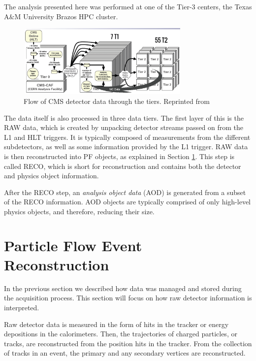 The analysis presented here was performed at one of the Tier-3 centers, the Texas A$\&$M University Brazos HPC cluster. 

 \begin{figure}[H]
 	\centering
 	\includegraphics[width=0.75\textwidth]{figures/dataflowtiers_MC.png}
 	\singlespace
 	\caption{Flow of CMS detector data through the tiers. Reprinted from \cite{CMSdatatier}}
 	\label{fig:datatier}
 \end{figure}

 The data itself is also processed in three data tiers. The first layer of this is the RAW data, which is created by unpacking detector streams passed on from the L1 and HLT triggers. It is typically composed of measurements from the different subdetectors, as well as some information provided by the L1 trigger. RAW data is then reconstructed into PF objects, as explained in Section \ref{sec:track}. This step is called RECO, which is short for reconstruction and contains both the detector and physics object information. 

 After the RECO step, an \textit{analysis object data} (AOD) is generated from a subset of the RECO information. AOD objects are typically comprised of only high-level physics objects, and therefore, reducing their size. 

\section{Particle Flow Event Reconstruction}
\label{sec:track}

 In the previous section we described how data was managed and stored during the acquisition process. This section will focus on how raw detector information is interpreted.  

Raw detector data is measured in the form of hits in the tracker or energy depositions in the calorimeters. Then, the trajectories of charged particles, or tracks, are reconstructed from the position hits in the tracker. From the collection of tracks in an event, the primary and any secondary vertices are reconstructed. 

